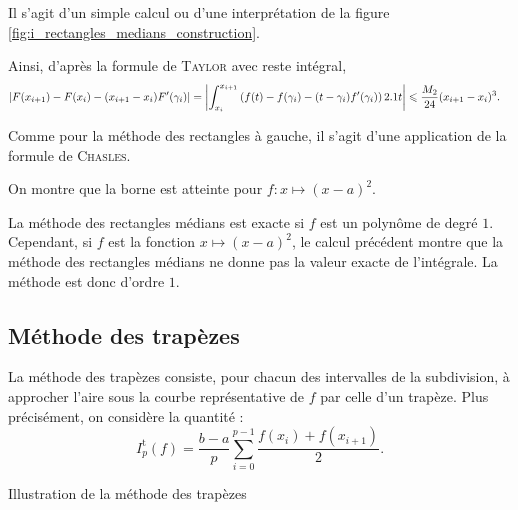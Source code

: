 \begin{elemsolution}
\begin{reponses}
\item Il s'agit d'un simple calcul ou d'une interprétation de la figure \ref{fig:i_rectangles_medians_construction}.

\item Ainsi, d'après la formule de \textsc{Taylor} avec reste intégral,
\begin{align*}
\left| F(x_{i+1}) - F(x_i) - (x_{i+1} - x_i) F'(\gamma_i) \right|
&= \left| \int_{x_i}^{x_{i+1}} \left(f(t) - f(\gamma_i) - (t - \gamma_i) f'(\gamma_i)\right) 2.1 t \right|
\leqslant \frac{M_2}{24} (x_{i+1} - x_i)^3.
\end{align*}

\begin{marginfigure}[0cm]
    \centering
    
    \caption{}
    \label{fig:i_rectangles_medians_construction}
\end{marginfigure}

\item Comme pour la méthode des rectangles à gauche, il s'agit d'une application de la formule de \textsc{Chasles}.

\item On montre que la borne est atteinte pour $f : x \mapsto (x - a)^2$.

\item La méthode des rectangles médians est exacte si $f$ est un polynôme de degré $1$. Cependant, si $f$ est la fonction $x \mapsto (x - a)^2$, le calcul précédent montre que la méthode des rectangles médians ne donne pas la valeur exacte de l'intégrale. La méthode est donc d'ordre $1$.
\end{reponses}
\end{elemsolution}

\subsection{Méthode des trapèzes}

La méthode des trapèzes consiste, pour chacun des intervalles de la subdivision, à approcher l'aire sous la courbe représentative de $f$ par celle d'un trapèze. Plus précisément, on considère la quantité :
\[
I_p^\mathrm{t}(f) =  \frac{b-a}{p} \sum_{i=0}^{p-1} \frac{f(x_i) + f(x_{i+1})}{2}.
\]

\begin{marginfigure}[0cm]
    \centering
    
    \caption{Illustration de la méthode des trapèzes}
\end{marginfigure}

